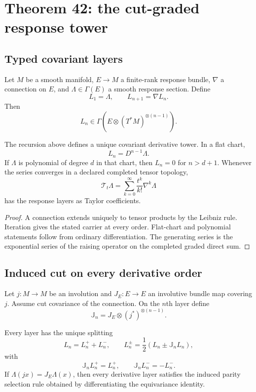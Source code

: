 \section{Theorem 42: the cut-graded response tower}

\subsection{Typed covariant layers}

Let $M$ be a smooth manifold, $E\to M$ a finite-rank response bundle, $\nabla$ a connection on $E$, and $\Lambda\in\Gamma(E)$ a smooth response section. Define
\[
 L_1=\Lambda,
 \qquad
 L_{n+1}=\nabla L_n.
\]
Then
\[
 L_n\in\Gamma\left(E\otimes(T^*M)^{\otimes(n-1)}\right).
\]

\begin{theorem}\label{thm:t42tower}
The recursion above defines a unique covariant derivative tower. In a flat chart,
\[
 L_n=D^{n-1}\Lambda.
\]
If $\Lambda$ is polynomial of degree $d$ in that chart, then $L_n=0$ for $n>d+1$. Whenever the series converges in a declared completed tensor topology,
\[
 \mathcal T_t\Lambda
 =\sum_{k=0}^\infty\frac{t^k}{k!}\nabla^k\Lambda
\]
has the response layers as Taylor coefficients.
\end{theorem}

\begin{proof}
A connection extends uniquely to tensor products by the Leibniz rule. Iteration gives the stated carrier at every order. Flat-chart and polynomial statements follow from ordinary differentiation. The generating series is the exponential series of the raising operator on the completed graded direct sum.
\end{proof}

\subsection{Induced cut on every derivative order}

Let $j:M\to M$ be an involution and $J_E:E\to E$ an involutive bundle map covering $j$. Assume cut covariance of the connection. On the $n$th layer define
\[
 \mathbb J_n=J_E\otimes(j^*)^{\otimes(n-1)}.
\]

\begin{theorem}\label{thm:t42grading}
Every layer has the unique splitting
\[
 L_n=L_n^++L_n^- ,
 \qquad
 L_n^\pm=\frac12(L_n\pm\mathbb J_nL_n),
\]
with
\[
 \mathbb J_nL_n^+=L_n^+,
 \qquad
 \mathbb J_nL_n^-=-L_n^-.
\]
If $\Lambda(jx)=J_E\Lambda(x)$, then every derivative layer satisfies the induced parity selection rule obtained by differentiating the equivariance identity.
\end{theorem}

